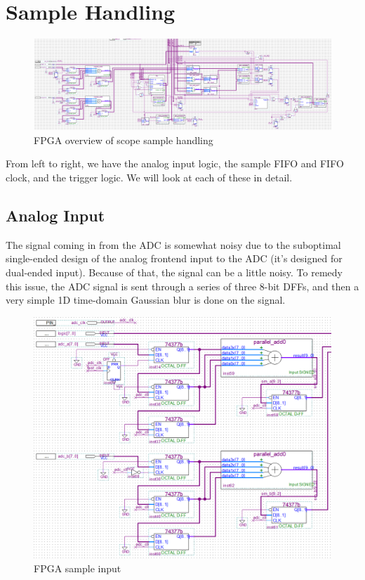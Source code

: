 \section{Sample Handling}

\begin{figure}[ht!]
    \centering
    \includegraphics[width=6in]{fpga_logic/adc_overview.png}
		\caption{FPGA overview of scope sample handling}
\end{figure}

From left to right, we have the analog input logic, the sample FIFO and FIFO clock, and the trigger logic. We will look at each of these in detail.

\subsection{Analog Input}

The signal coming in from the ADC is somewhat noisy due to the suboptimal single-ended design of the analog frontend input to the ADC (it's designed for dual-ended input). Because of that, the signal can be a little noisy. To remedy this issue, the ADC signal is sent through a series of three 8-bit DFFs, and then a very simple 1D time-domain Gaussian blur is done on the signal.

\begin{figure}[ht!]
    \centering
    \includegraphics[width=5in]{fpga_logic/adc_input.png}
		\caption{FPGA sample input}
\end{figure}


